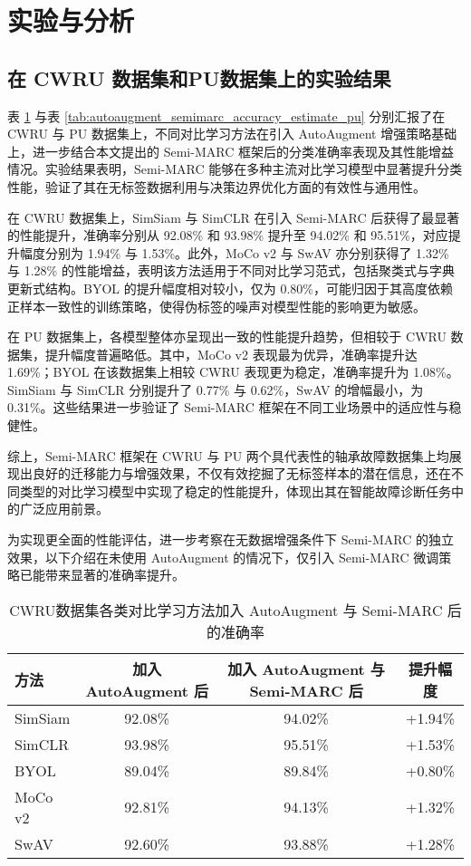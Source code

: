 \documentclass[master]{thesis-uestc}
\begin{document}
\section{实验与分析}

\subsection{在 CWRU 数据集和PU数据集上的实验结果}
表 \ref{tab:autoaugment_semimarc_accuracy_estimate} 与表 \ref{tab:autoaugment_semimarc_accuracy_estimate_pu} 分别汇报了在 CWRU 与 PU 数据集上，不同对比学习方法在引入 AutoAugment 增强策略基础上，进一步结合本文提出的 Semi-MARC 框架后的分类准确率表现及其性能增益情况。实验结果表明，Semi-MARC 能够在多种主流对比学习模型中显著提升分类性能，验证了其在无标签数据利用与决策边界优化方面的有效性与通用性。

在 CWRU 数据集上，SimSiam 与 SimCLR 在引入 Semi-MARC 后获得了最显著的性能提升，准确率分别从 92.08\% 和 93.98\% 提升至 94.02\% 和 95.51\%，对应提升幅度分别为 1.94\% 与 1.53\%。此外，MoCo v2 与 SwAV 亦分别获得了 1.32\% 与 1.28\% 的性能增益，表明该方法适用于不同对比学习范式，包括聚类式与字典更新式结构。BYOL 的提升幅度相对较小，仅为 0.80\%，可能归因于其高度依赖正样本一致性的训练策略，使得伪标签的噪声对模型性能的影响更为敏感。

在 PU 数据集上，各模型整体亦呈现出一致的性能提升趋势，但相较于 CWRU 数据集，提升幅度普遍略低。其中，MoCo v2 表现最为优异，准确率提升达 1.69\%；BYOL 在该数据集上相较 CWRU 表现更为稳定，准确率提升为 1.08\%。SimSiam 与 SimCLR 分别提升了 0.77\% 与 0.62\%，SwAV 的增幅最小，为 0.31\%。这些结果进一步验证了 Semi-MARC 框架在不同工业场景中的适应性与稳健性。

综上，Semi-MARC 框架在 CWRU 与 PU 两个具代表性的轴承故障数据集上均展现出良好的迁移能力与增强效果，不仅有效挖掘了无标签样本的潜在信息，还在不同类型的对比学习模型中实现了稳定的性能提升，体现出其在智能故障诊断任务中的广泛应用前景。

为实现更全面的性能评估，进一步考察在无数据增强条件下 Semi-MARC 的独立效果，以下介绍在未使用 AutoAugment 的情况下，仅引入 Semi-MARC 微调策略已能带来显著的准确率提升。
\begin{table}[h]
    \centering
    \caption{CWRU数据集各类对比学习方法加入 AutoAugment 与 Semi-MARC 后的准确率}
    \renewcommand\arraystretch{1.2}
    \begin{tabular}{lccc}
        \toprule
        方法 & 加入 AutoAugment 后 & 加入 AutoAugment 与 Semi-MARC 后 & 提升幅度 \\
        \midrule
        SimSiam & 92.08\% & 94.02\% & +1.94\% \\
        SimCLR  & 93.98\% & 95.51\% & +1.53\% \\
        BYOL    & 89.04\% & 89.84\% & +0.80\% \\
        MoCo v2 & 92.81\% & 94.13\% & +1.32\% \\
        SwAV    & 92.60\% & 93.88\% & +1.28\% \\
        \bottomrule
    \end{tabular}
    \label{tab:autoaugment_semimarc_accuracy_estimate}
\end{table}
\end{document}
